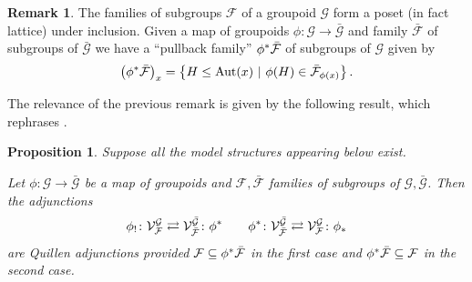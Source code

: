 \documentclass[a4paper,10pt
,draft
]{article}%
\numberwithin{equation}{section}
\numberwithin{figure}{section}
\newtheorem{proposition}[equation]{Proposition}%
\theoremstyle{definition} %
\newtheorem{remark}[equation]{Remark}%
\DeclareMathOperator{\Aut}{Aut}%
\newcommand{\F}{\ensuremath{\mathcal F}}
\newcommand{\V}{\ensuremath{\mathcal V}}
\newcommand{\G}{\ensuremath{\mathcal G}}
\newcommand{\1}{\ensuremath{\mathbbm 1}}%
\begin{document}
\begin{remark}
The families of subgroups $\F$ of a groupoid $\G$ 
form a poset (in fact lattice) under inclusion.
Given a map of groupoids $\phi\colon \G \to \bar{\G}$
and family $\bar{\F}$ of subgroups of $\bar{\G}$
we have a ``pullback family'' 
$\phi^{\**} \bar{\F}$ 
of subgroups of $\G$ given by
\begin{equation}
      \label{PHISTAR_EQ}
      \left(\phi^{\**} \bar{\F} \right)_{x}
      =
      \left\{H \leq \Aut(x) \ | \ \phi(H) \in \bar{\F}_{\phi(x)}\right\}.
\end{equation}
\end{remark}



The relevance of the previous remark is given by the following result,
which rephrases \cite[Props. 6.6, 6.7]{BP_geo}.


\begin{proposition}\label{EQQUILADJ PROP}
Suppose all the model structures appearing below exist.

Let $\phi \colon \G \to \bar{\G}$
be a map of groupoids and
$\F,\bar{\F}$ families of subgroups of $\G,\bar{\G}$.
Then the adjunctions
\begin{equation}\label{FAMADJ EQ}
	\phi_! \colon \V^{\G}_{\F}
	\rightleftarrows
	\V^{\bar{\G}}_{\bar{\F}} \colon \phi^{\**}
\qquad
	\phi^{\**} \colon \V^{\bar{\G}}_{\bar{\F}} 
	\rightleftarrows
	\V^{\G}_{\F} \colon \phi_{\**}
\end{equation}
are Quillen adjunctions provided
$\F \subseteq \phi^{\**} \bar{\F}$
in the first case and 
$\phi^{\**} \bar{\F} \subseteq \F$
in the second case.
\end{proposition}
\end{document}
